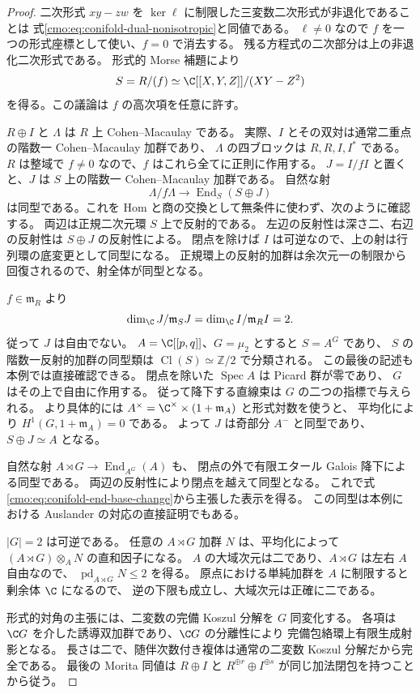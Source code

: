 \begin{proof}
二次形式 $xy-zw$ を $\ker\ell$ に制限した三変数二次形式が非退化であることは
式\eqref{cmo:eq:conifold-dual-nonisotropic}と同値である。
$\ell\ne0$ なので $f$ を一つの形式座標として使い、$f=0$ で消去する。
残る方程式の二次部分は上の非退化二次形式である。
形式的 Morse 補題により
\[
 S=R/(f)\simeq\C[[X,Y,Z]]/(XY-Z^2)
\]
を得る。この議論は $f$ の高次項を任意に許す。

$R\oplus I$ と $\Lambda$ は $R$ 上 Cohen--Macaulay である。
実際、$I$ とその双対は通常二重点の階数一 Cohen--Macaulay 加群であり、
$\Lambda$ の四ブロックは $R,R,I,I^*$ である。
$R$ は整域で $f\ne0$ なので、$f$ はこれら全てに正則に作用する。
$J=I/fI$ と置くと、$J$ は $S$ 上の階数一 Cohen--Macaulay 加群である。
自然な射
\begin{equation}\label{cmo:eq:conifold-end-base-change}
 \Lambda/f\Lambda\longrightarrow
     \operatorname{End}_S(S\oplus J)
\end{equation}
は同型である。これを Hom と商の交換として無条件に使わず、次のように確認する。
両辺は正規二次元環 $S$ 上で反射的である。
左辺の反射性は深さ二、右辺の反射性は $S\oplus J$ の反射性による。
閉点を除けば $I$ は可逆なので、上の射は行列環の底変更として同型になる。
正規環上の反射的加群は余次元一の制限から回復されるので、射全体が同型となる。

$f\in\mathfrak m_R$ より
\[
 \dim_\C J/\mathfrak m_SJ
 =\dim_\C I/\mathfrak m_RI=2.
\]
従って $J$ は自由でない。
$A=\C[[p,q]]$、$G=\mu_2$ とすると $S=A^G$ であり、
$S$ の階数一反射的加群の同型類は $\operatorname{Cl}(S)\simeq\mathbb Z/2$ で分類される。
この最後の記述も本例では直接確認できる。
閉点を除いた $\operatorname{Spec}A$ は Picard 群が零であり、
$G$ はその上で自由に作用する。
従って降下する直線束は $G$ の二つの指標で与えられる。
より具体的には $A^\times=\C^\times\times(1+\mathfrak m_A)$ と形式対数を使うと、
平均化により $H^1(G,1+\mathfrak m_A)=0$ である。
よって $J$ は奇部分 $A^-$ と同型であり、$S\oplus J\simeq A$ となる。

自然な射 $A\rtimes G\to\operatorname{End}_{A^G}(A)$ も、
閉点の外で有限エタール Galois 降下による同型である。
両辺の反射性により閉点を越えて同型となる。
これで式\eqref{cmo:eq:conifold-end-base-change}から主張した表示を得る。
この同型は本例における Auslander の対応の直接証明でもある。

$|G|=2$ は可逆である。
任意の $A\rtimes G$ 加群 $N$ は、平均化によって
$(A\rtimes G)\otimes_A N$ の直和因子になる。
$A$ の大域次元は二であり、$A\rtimes G$ は左右 $A$ 自由なので、
$\operatorname{pd}_{A\rtimes G}N\le2$ を得る。
原点における単純加群を $A$ に制限すると剰余体 $\C$ になるので、
逆の下限も成立し、大域次元は正確に二である。

形式的対角の主張には、二変数の完備 Koszul 分解を $G$ 同変化する。
各項は $\C G$ を介した誘導双加群であり、$\C G$ の分離性により
完備包絡環上有限生成射影となる。
長さは二で、随伴次数付き複体は通常の二変数 Koszul 分解だから完全である。
最後の Morita 同値は $R\oplus I$ と $R^{\oplus r}\oplus I^{\oplus s}$ が同じ加法閉包を持つことから従う。
\end{proof}

